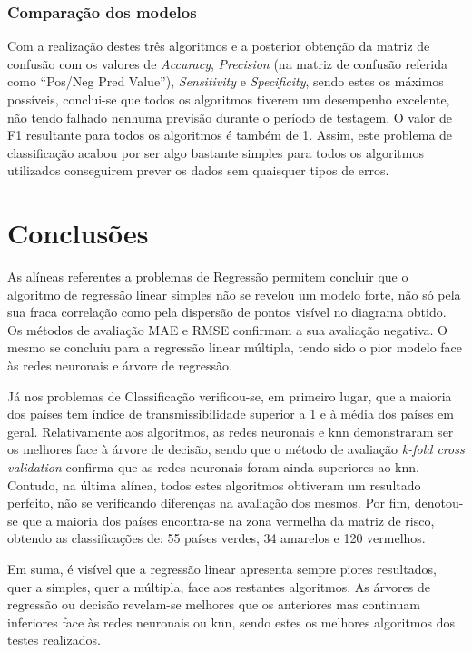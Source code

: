 \documentclass[conference]{IEEEtran}
\begin{document}
\subsubsection{Comparação dos modelos}
Com a realização destes três algoritmos e a posterior obtenção da matriz de confusão com os valores de \textit{Accuracy}, \textit{Precision} (na matriz de confusão referida como “Pos/Neg Pred Value”), \textit{Sensitivity} e \textit{Specificity}, sendo estes os máximos possíveis, conclui-se que todos os algoritmos tiverem um desempenho excelente, não tendo falhado nenhuma previsão durante o período de testagem. O valor de F1 resultante para todos os algoritmos é também de 1.
Assim, este problema de classificação acabou por ser algo bastante simples para todos os algoritmos utilizados conseguirem prever os dados sem quaisquer tipos de erros.



\section{Conclusões} %
As alíneas referentes a problemas de Regressão permitem concluir que o algoritmo de regressão linear simples não se revelou um modelo forte, não só pela sua fraca correlação como pela dispersão de pontos visível no diagrama obtido. Os métodos de avaliação MAE e RMSE confirmam a sua avaliação negativa. O mesmo se concluiu para a regressão linear múltipla, tendo sido o pior modelo face às redes neuronais e árvore de regressão. 

Já nos problemas de Classificação verificou-se, em primeiro lugar, que a maioria dos países tem índice de transmissibilidade superior a 1 e à média dos países em geral. Relativamente aos algoritmos, as redes neuronais e knn demonstraram ser os melhores face à árvore de decisão, sendo que o método de avaliação \textit{k-fold cross validation} confirma que as redes neuronais foram ainda superiores ao knn. Contudo, na última alínea, todos estes algoritmos obtiveram um resultado perfeito, não se verificando diferenças na avaliação dos mesmos. Por fim, denotou-se que a maioria dos países encontra-se na zona vermelha da matriz de risco, obtendo as classificações de: 55 países verdes, 34 amarelos e 120 vermelhos. 

Em suma, é visível que a regressão linear apresenta sempre piores resultados, quer a simples, quer a múltipla, face aos restantes algoritmos. As árvores de regressão ou decisão revelam-se melhores que os anteriores mas continuam inferiores face às redes neuronais ou knn, sendo estes os melhores algoritmos dos testes realizados. 
\end{document}
